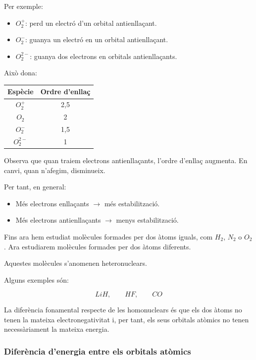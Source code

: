 \documentclass[12pt]{article}
\begin{document}
Per exemple:

\begin{itemize}
    \item \(O_2^+\): perd un electró d'un orbital antienllaçant.
    \item \(O_2^-\): guanya un electró en un orbital antienllaçant.
    \item \(O_2^{2-}\): guanya dos electrons en orbitals antienllaçants.
\end{itemize}

Això dona:

\begin{center}
\begin{tabular}{c|c}
\textbf{Espècie} & \textbf{Ordre d'enllaç}\\
\hline
\(O_2^+\) & 2,5\\
\(O_2\) & 2\\
\(O_2^-\) & 1,5\\
\(O_2^{2-}\) & 1
\end{tabular}
\end{center}

Observa que quan traiem electrons antienllaçants,
l'ordre d'enllaç augmenta. En canvi, quan n'afegim,
disminueix.

Per tant, en general:

\begin{itemize}
    \item Més electrons enllaçants \(\longrightarrow\)
    més estabilització.
    \item Més electrons antienllaçants \(\longrightarrow\)
    menys estabilització.
\end{itemize}


\bigskip
\noindent{}

Fins ara hem estudiat molècules formades per dos àtoms iguals,
com \(H_2\), \(N_2\) o \(O_2\). Ara estudiarem molècules
formades per dos àtoms diferents.

Aquestes molècules s'anomenen heteronuclears.

Alguns exemples són:

\[
LiH,\qquad HF,\qquad CO
\]

La diferència fonamental respecte de les homonuclears és que
els dos àtoms no tenen la mateixa electronegativitat i,
per tant, els seus orbitals atòmics no tenen necessàriament
la mateixa energia.


\subsubsection*{Diferència d'energia entre els orbitals atòmics}
\end{document}
